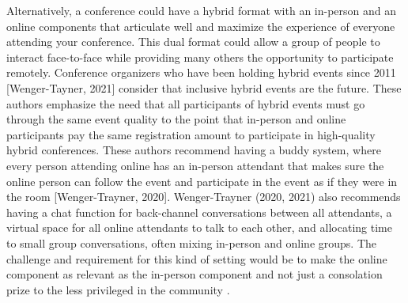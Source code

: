 \documentclass[10pt,letterpaper]{article}
\begin{document}



Alternatively, a conference could have a hybrid format with an in-person and an online components that articulate well and maximize the experience of everyone attending your conference. This dual format could allow a group of people to interact face-to-face while providing many others the opportunity to participate remotely. 
Conference organizers who have been holding hybrid events since 2011 [Wenger-Tayner, 2021] consider that inclusive hybrid events are the future. These authors emphasize the need that all participants of hybrid events must go through the same event quality to the point that in-person and online participants pay the same registration amount to participate in high-quality hybrid conferences. These authors recommend having a buddy system, where every person attending online has an in-person attendant that makes sure the online person can follow the event and participate in the event as if they were in the room [Wenger-Trayner, 2020]. Wenger-Trayner (2020, 2021) also recommends having a chat function for back-channel conversations between all attendants, a virtual space for all online attendants to talk to each other, and allocating time to small group conversations, often mixing in-person and online groups. 
The challenge and requirement for this kind of setting would be to make the online component as relevant as the in-person component and not just a consolation prize to the less privileged in the community \cite{jooKeepOnlineOption2021,ninerBetterWhomLeveling2021}.
\end{document}
